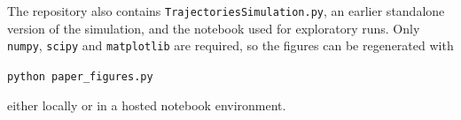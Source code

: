 \documentclass[11pt,a4paper]{article}
\begin{document}
The repository also contains \texttt{TrajectoriesSimulation.py}, an earlier
standalone version of the simulation, and the notebook used for exploratory
runs. Only \texttt{numpy}, \texttt{scipy} and \texttt{matplotlib} are required,
so the figures can be regenerated with
\begin{center}
\texttt{python paper\_figures.py}
\end{center}
either locally or in a hosted notebook environment.



\end{document}
